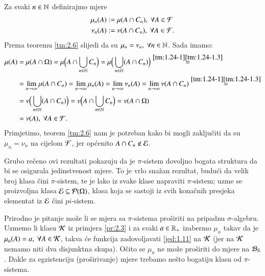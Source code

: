 \begin{rj}[\ref{zad:2.9}]
    Za svaki $n \in \mathbb{N}$ definirajmo mjere
    \begin{equation*}
        \begin{aligned}
            \mu_n (A) &:= \mu (A \cap C_n), \; \forall A \in \mathcal{F}\\
            \nu_n (A) &:= \nu (A \cap C_n), \; \forall A \in \mathcal{F}.
        \end{aligned}
    \end{equation*}
    Prema teoremu \ref{tm:2.6} slijedi da su $\mu_n = \nu_n, \; \forall n \in \mathbb{N}$. Sada imamo:
    \begin{equation*}
        \begin{aligned}
            \mu (A) &= \mu (A \cap \Omega) = \mu \Big( A \cap \bigcup\limits_{n \in \mathbb{N}}^{} C_n \Big) = \mu \Big( \bigcup\limits_{n \in \mathbb{N}}^{} (A \cap C_n) \Big) \overset{\ref{tm:1.24-1} \ref{tm:1.24-1.3}}{=}\\
            &= \lim\limits_{n \to \infty} \mu(A \cap C_n) = \lim\limits_{n \to \infty} \mu_n (A) = \lim\limits_{n \to \infty} \nu_n (A) = \lim\limits_{n \to \infty} \nu (A \cap C_n) \overset{\ref{tm:1.24-1} \ref{tm:1.24-1.3}}{=}\\
            &= \nu \Big( \bigcup\limits_{n \in \mathbb{N}}^{} (A \cap C_n) \Big) = \nu \Big( A \cap \bigcup\limits_{n \in \mathbb{N}}^{} C_n \Big) = \nu(A \cap \Omega)\\
            &= \nu(A), \; \forall A \in \mathcal{F}.
        \end{aligned}
    \end{equation*}
    Primjetimo, teorem \ref{tm:2.6} nam je potreban kako bi mogli zaklju\v citi da su $\mu_n = \nu_n$ na cijelom $\mathcal{F}$, jer op\' cenito $A \cap C_n \notin \mathcal{E}$.
\end{rj}

\begin{nap} \label{nap:2.10}
    Grubo re\v ceno ovi rezultati pokazuju da je $\pi$-sistem dovoljno bogata struktura da bi se osigurala jedinstvenost mjere.
    To je vrlo sna\v zan rezultat, budu\' ci da velik broj klasa \v cini $\pi$-sistem, te je lako iz svake klase napraviti $\pi$-sistem; uzme se proizvoljna klasa $\mathcal{E} \subseteq \mathcal{P}({\Omega})$, klasa koja se sastoji iz svih kona\v cnih presjeka elementat iz $\mathcal{E}$ \v cini $pi$-sistem.

    Prirodno je pitanje mo\v ze li se mjera sa $\pi$-sistema pro\v siriti na pripadnu $\sigma$-algebru.
    Uzmemo li klasu $\mathcal{K}$ iz primjera \ref{pr:2.3} i za svaki $a \in \mathbb{R}_+$ izabermo $\mu_a$ takav da je $\mu_a(A) = a, \; \forall A \in \mathcal{K}$, takva \' ce funkcija zadovoljavati \eqref{jed:1.11} na $\mathcal{K}$ (jer na $\mathcal{K}$ nemamo niti dva disjunktna skupa).
    O\v cito se $\mu_a$ ne mo\v ze pro\v siriti do mjere na $\mathcal{B}_{\mathbb{R}}$.
    Dakle za egzistenciju  (pro\v sirivanje) mjere trebamo ne\v sto bogatiju klasu od $\pi$-sistema.
\end{nap}

